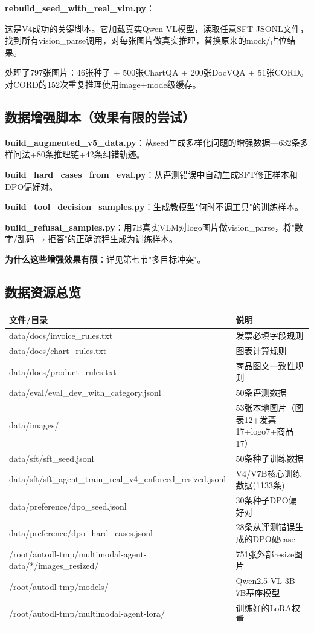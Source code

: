 \documentclass[fontset=none,11pt,a4paper]{ctexart}
\begin{document}
\textbf{rebuild\_seed\_with\_real\_vlm.py}：

这是V4成功的关键脚本。它加载真实Qwen-VL模型，读取任意SFT JSONL文件，找到所有vision\_parse调用，对每张图片做真实推理，替换原来的mock/占位结果。

处理了797张图片：46张种子 + 500张ChartQA + 200张DocVQA + 51张CORD。对CORD的152次重复推理使用image+mode级缓存。

\subsection{数据增强脚本（效果有限的尝试）}

\textbf{build\_augmented\_v5\_data.py}：从seed生成多样化问题的增强数据---632条多样问法+80条推理链+42条纠错轨迹。

\textbf{build\_hard\_cases\_from\_eval.py}：从评测错误中自动生成SFT修正样本和DPO偏好对。

\textbf{build\_tool\_decision\_samples.py}：生成教模型"何时不调工具"的训练样本。

\textbf{build\_refusal\_samples.py}：用7B真实VLM对logo图片做vision\_parse，将"数字/乱码$\to$拒答"的正确流程生成为训练样本。

\textbf{为什么这些增强效果有限}：详见第七节"多目标冲突"。

\subsection{数据资源总览}

\begin{longtable}{lp{8cm}}
\toprule
文件/目录 & 说明 \\
\midrule
data/docs/invoice\_rules.txt & 发票必填字段规则 \\
data/docs/chart\_rules.txt & 图表计算规则 \\
data/docs/product\_rules.txt & 商品图文一致性规则 \\
data/eval/eval\_dev\_with\_category.jsonl & 50条评测数据 \\
data/images/ & 53张本地图片（图表12+发票17+logo7+商品17） \\
data/sft/sft\_seed.jsonl & 50条种子训练数据 \\
data/sft/sft\_agent\_train\_real\_v4\_enforced\_resized.jsonl & V4/V7B核心训练数据(1133条) \\
data/preference/dpo\_seed.jsonl & 30条种子DPO偏好对 \\
data/preference/dpo\_hard\_cases.jsonl & 28条从评测错误生成的DPO硬case \\
/root/autodl-tmp/multimodal-agent-data/*/images\_resized/ & 751张外部resize图片 \\
/root/autodl-tmp/models/ & Qwen2.5-VL-3B + 7B基座模型 \\
/root/autodl-tmp/multimodal-agent-lora/ & 训练好的LoRA权重 \\
\bottomrule
\end{longtable}
\end{document}
